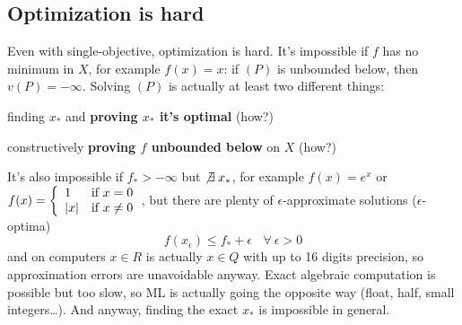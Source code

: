 \documentclass[10pt]{report}
\begin{document}
\subsection{Optimization is hard}
Even with single-objective, optimization is hard. It's impossible if $f$ has no minimum in $X$, for example $f(x) = x$: if $(P)$ is unbounded below, then $v(P) = -\infty$. Solving $(P)$ is actually at least two different things:
\begin{list}{}{}
	\item finding $x_*$ and \textbf{proving $x_*$ it's optimal} (how?)
	\item constructively \textbf{proving $f$ unbounded below} on $X$ (how?)
\end{list}
It's also impossible if $f_* > -\infty$ but $\not\exists\:x_*$, for example $f(x) = e^x$ or $f(x)=\left\{\begin{array}{l l}
1&\hbox{if }x = 0\\
|x|&\hbox{if }x \neq 0
\end{array}\right.$, but there are plenty of $\epsilon$-approximate solutions ($\epsilon$-optima) $$f(x_\epsilon)\leq f_* + \epsilon\:\:\:\:\forall\:\epsilon>0$$
and on computers $x\in R$ is actually $x\in Q$ with up to 16 digits precision, so approximation errors are unavoidable anyway. Exact algebraic computation is possible but too slow, so ML is actually going the opposite way (float, half, small integers\ldots). And anyway, finding the exact $x_*$ is impossible in general.
\end{document}
